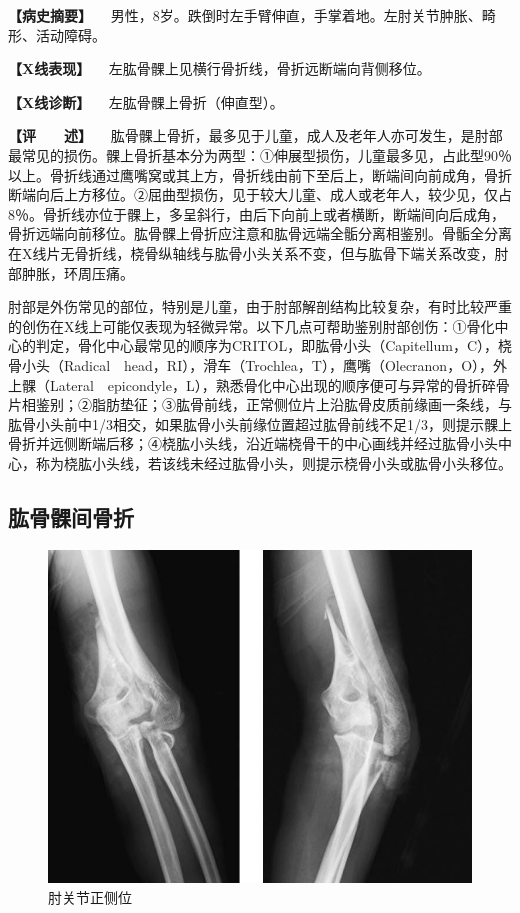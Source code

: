 \textbf{【病史摘要】}
　男性，8岁。跌倒时左手臂伸直，手掌着地。左肘关节肿胀、畸形、活动障碍。

\textbf{【X线表现】} 　左肱骨髁上见横行骨折线，骨折远断端向背侧移位。

\textbf{【X线诊断】} 　左肱骨髁上骨折（伸直型）。

\textbf{【评　　述】}
　肱骨髁上骨折，最多见于儿童，成人及老年人亦可发生，是肘部最常见的损伤。髁上骨折基本分为两型：①伸展型损伤，儿童最多见，占此型90％以上。骨折线通过鹰嘴窝或其上方，骨折线由前下至后上，断端间向前成角，骨折断端向后上方移位。②屈曲型损伤，见于较大儿童、成人或老年人，较少见，仅占8％。骨折线亦位于髁上，多呈斜行，由后下向前上或者横断，断端间向后成角，骨折远端向前移位。肱骨髁上骨折应注意和肱骨远端全骺分离相鉴别。骨骺全分离在X线片无骨折线，桡骨纵轴线与肱骨小头关系不变，但与肱骨下端关系改变，肘部肿胀，环周压痛。

肘部是外伤常见的部位，特别是儿童，由于肘部解剖结构比较复杂，有时比较严重的创伤在X线上可能仅表现为轻微异常。以下几点可帮助鉴别肘部创伤：①骨化中心的判定，骨化中心最常见的顺序为CRITOL，即肱骨小头（Capitellum，C），桡骨小头（Radical　head，RI），滑车（Trochlea，T），鹰嘴（Olecranon，O），外上髁（Lateral　epicondyle，L），熟悉骨化中心出现的顺序便可与异常的骨折碎骨片相鉴别；②脂肪垫征；③肱骨前线，正常侧位片上沿肱骨皮质前缘画一条线，与肱骨小头前中1/3相交，如果肱骨小头前缘位置超过肱骨前线不足1/3，则提示髁上骨折并远侧断端后移；④桡肱小头线，沿近端桡骨干的中心画线并经过肱骨小头中心，称为桡肱小头线，若该线未经过肱骨小头，则提示桡骨小头或肱骨小头移位。

\subsection{肱骨髁间骨折}

\begin{figure}[!htbp]
 \centering
 \includegraphics{./images/Image00032.jpg}
 \captionsetup{justification=centering}
 \caption{肘关节正侧位}
 \label{fig2-3-5}
  \end{figure} 

